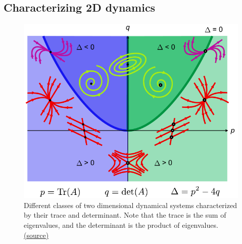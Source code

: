 \documentclass[a4paper,11pt]{exam}
\newcounter{ct}
\begin{document}
\begin{questions}
\subsection{Characterizing 2D dynamics}
\begin{figure}[t]
    \centering
    \includegraphics{figs/phase_plane_nodes.pdf}
    \caption{Different classes of two dimensional dynamical systems characterized by their trace and determinant.
	Note that the trace is the sum of eigenvalues, and the determinant is the product of eigenvalues.
	\href{https://commons.wikimedia.org/wiki/File:Phase_plane_nodes.svg}{(source)}
    }
\end{figure}

\end{questions}
\end{document}
